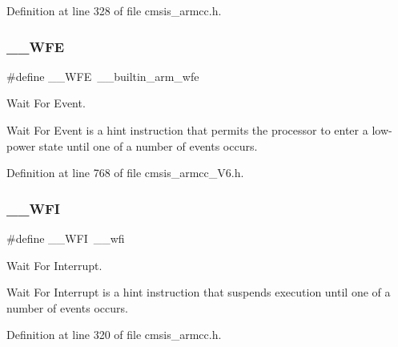 Definition at line 328 of file cmsis\+\_\+armcc.\+h.

\mbox{\label{group___c_m_s_i_s___core___instruction_interface_gaac6cc7dd4325d9cb40d3290fa5244b3d}} 
\subsubsection{\texorpdfstring{\+\_\+\+\_\+\+W\+FE}{\_\_WFE}\hspace{0.1cm}{\footnotesize\ttfamily [2/2]}}
{\footnotesize\ttfamily \#define \+\_\+\+\_\+\+W\+FE~\+\_\+\+\_\+builtin\+\_\+arm\+\_\+wfe}



Wait For Event. 

Wait For Event is a hint instruction that permits the processor to enter a low-\/power state until one of a number of events occurs. 

Definition at line 768 of file cmsis\+\_\+armcc\+\_\+\+V6.\+h.

\mbox{\label{group___c_m_s_i_s___core___instruction_interface_gad23bf2b78a9a4524157c9de0d30b7448}} 
\subsubsection{\texorpdfstring{\+\_\+\+\_\+\+W\+FI}{\_\_WFI}\hspace{0.1cm}{\footnotesize\ttfamily [1/2]}}
{\footnotesize\ttfamily \#define \+\_\+\+\_\+\+W\+FI~\+\_\+\+\_\+wfi}



Wait For Interrupt. 

Wait For Interrupt is a hint instruction that suspends execution until one of a number of events occurs. 

Definition at line 320 of file cmsis\+\_\+armcc.\+h.

